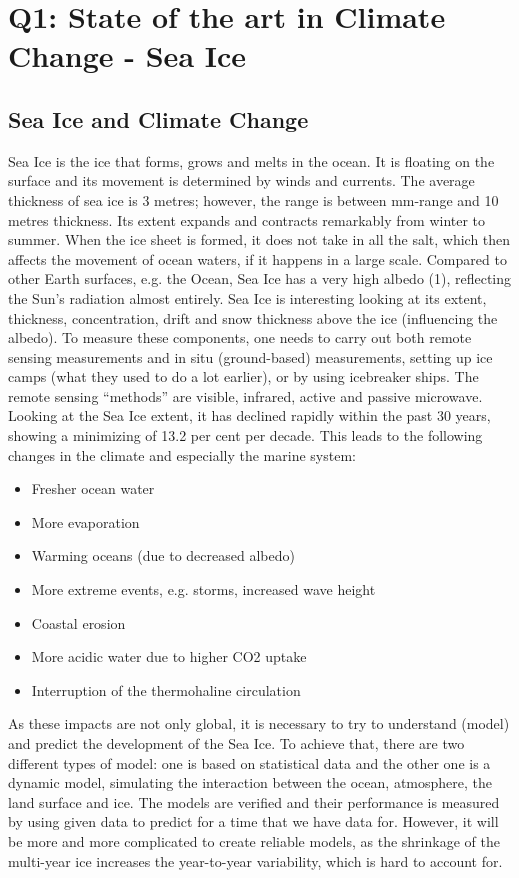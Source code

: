 \section{Q1: State of the art in Climate Change - Sea Ice}

\subsection{Sea Ice and Climate Change}
Sea Ice is the ice that forms, grows and melts in the ocean. It is floating on the surface and its movement is determined by winds and currents. The average thickness of sea ice is 3 metres; however, the range is between mm-range and 10 metres thickness. Its extent expands and contracts remarkably from winter to summer. When the ice sheet is formed, it does not take in all the salt, which then affects the movement of ocean waters, if it happens in a large scale.
Compared to other Earth surfaces, e.g. the Ocean, Sea Ice has a very high albedo (1), reflecting the Sun’s radiation almost entirely.
Sea Ice is interesting looking at its extent, thickness, concentration, drift and snow thickness above the ice (influencing the albedo). To measure these components, one needs to carry out both remote  sensing measurements and in situ (ground-based) measurements, setting up ice camps (what they used to do a lot earlier), or by using icebreaker ships. The remote sensing “methods” are visible, infrared, active and passive microwave.
Looking at the Sea Ice extent, it has declined rapidly within the past 30 years, showing a minimizing of 13.2 per cent per decade.
This leads to the following changes in the climate and especially the marine system:
\begin{itemize}
    \item Fresher ocean water
    \item More evaporation
    \item Warming oceans (due to decreased albedo)
    \item More extreme events, e.g. storms, increased wave height
    \item Coastal erosion
    \item More acidic water due to higher CO2 uptake
	\item Interruption of the thermohaline circulation
\end{itemize}
As these impacts are not only global, it is necessary to try to understand (model) and predict the development of the Sea Ice. To achieve that, there are two different types of model: one is based on statistical data and the other one is a dynamic model, simulating the interaction between the ocean, atmosphere, the land surface and ice. The models are verified and their performance is measured by using given data to predict for a time that we have data for. However, it will be more and more complicated to create reliable models, as the shrinkage of the multi-year ice increases the year-to-year variability, which is hard to account for.\\
